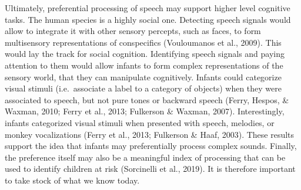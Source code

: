 \documentclass[man]{apa6}
\begin{document}
Ultimately, preferential processing of speech may support higher level
cognitive tasks. The human species is a highly social one. Detecting
speech signals would allow to integrate it with other sensory percepts,
such as faces, to form multisensory representations of conspecifics
(Vouloumanos et al., 2009). This would lay the track for social
cognition. Identifying speech signals and paying attention to them would
allow infants to form complex representations of the sensory world, that
they can manipulate cognitively. Infants could categorize visual stimuli
(i.e.~associate a label to a category of objects) when they were
associated to speech, but not pure tones or backward speech (Ferry,
Hespos, \& Waxman, 2010; Ferry et al., 2013; Fulkerson \& Waxman, 2007).
Interestingly, infants categorized visual stimuli when presented with
speech, melodies, or monkey vocalizations (Ferry et al., 2013; Fulkerson
\& Haaf, 2003). These results support the idea that infants may
preferentially process complex sounds. Finally, the preference itself
may also be a meaningful index of processing that can be used to
identify children at risk (Sorcinelli et al., 2019). It is therefore
important to take stock of what we know today.
\end{document}
